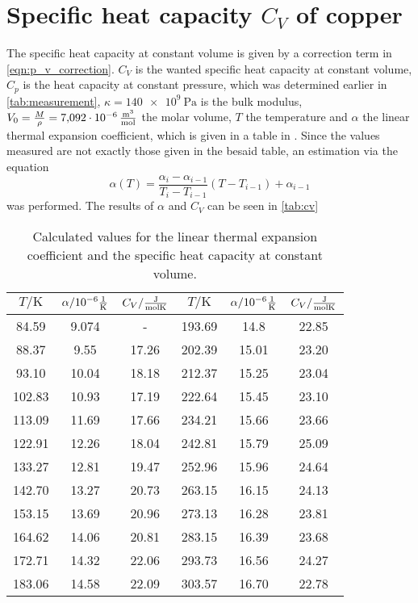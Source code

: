\section{Specific heat capacity $C_V$ of copper}

The specific heat capacity at constant volume is given by a correction term in \autoref{eqn:p_v_correction}. $C_V$ is  
the wanted specific heat capacity at constant volume, $C_p$ is the heat capacity at constant pressure, which was determined earlier in 
\autoref{tab:measurement}, $\kappa = \qty{140e9}{\pascal}$ \cite{copper} is the bulk modulus, $V_0 = \frac{M}{\rho}= \qty{7.092e-6}{\frac{\meter^3}{\mol}} $\cite{copper} the molar volume, $T$ the temperature and $\alpha$ the linear thermal 
expansion coefficient, which is given in a table in \cite{v47}. Since the values measured are not exactly those given in the besaid table,
an estimation via the equation
\begin{equation}
    \alpha(T) = \frac{\alpha_i - \alpha_{i-1}}{T_i - T_{i-1}}\left(T - T_{i-1} \right) + \alpha_{i-1}
\end{equation}
was performed. The results of $\alpha$ and $C_V$ can be seen in \autoref{tab:cv}

\begin{table}[htbp] 
    \centering 
    \begin{tabular}{cc c| ccc} 
        \toprule $T/\unit{\kelvin}$ & $\alpha/\unit{10^{-6}\frac{1}{\kelvin}}$ & $C_V / \unit{\frac{\joule}{\mol\kelvin}} $ & $T/\unit{\kelvin}$ & $\alpha/\unit{10^{-6}\frac{1}{\kelvin}}$ & $C_V / \unit{\frac{\joule}{\mol\kelvin}} $\\ 
        \midrule 
        84.59  & 9.074 & - & 193.69 &  14.8 &  22.85  \\   
        88.37  & 9.55  & 17.26 & 202.39 & 15.01 & 23.20    \\
        93.10  & 10.04 & 18.18  & 212.37 & 15.25 & 23.04     \\
        102.83 & 10.93 & 17.19  & 222.64 & 15.45 & 23.10    \\
        113.09 & 11.69 & 17.66  & 234.21 & 15.66 & 23.66     \\
        122.91 & 12.26 & 18.04 & 242.81 & 15.79 & 25.09    \\
        133.27 & 12.81 & 19.47  & 252.96 & 15.96 & 24.64     \\
        142.70 & 13.27 & 20.73  & 263.15 & 16.15 & 24.13    \\
        153.15 & 13.69 & 20.96  & 273.13 & 16.28 & 23.81 \\
        164.62 & 14.06 & 20.81 & 283.15 & 16.39 & 23.68     \\
        172.71 & 14.32 & 22.06  & 293.73 & 16.56 & 24.27    \\
        183.06 & 14.58 & 22.09 & 303.57 & 16.70 &  22.78   \\

        \bottomrule 
    \end{tabular} 
    \caption[Tabelle]{Calculated values for the linear thermal expansion coefficient and the specific heat capacity at constant volume.} 
    \label{tab:cv} 
\end{table}

